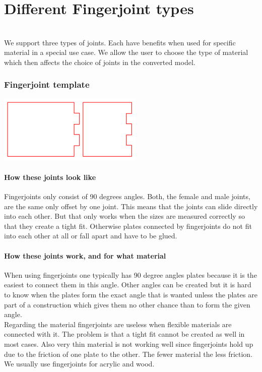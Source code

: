 \documentclass[../ClassicThesis.tex]{subfiles}
\begin{document}
\section{Different Fingerjoint types}
\\
We support three types of joints. Each have benefits when used for specific material in a special use case. We allow the user to choose the type of material which then affects the choice of joints in the converted model.
\subsubsection{Fingerjoint template}
\includegraphics[width=0.5\columnwidth]{Images/fingerjoints.png}
\paragraph{How these joints look like}
Fingerjoints only consist of 90 degrees angles. Both, the female and male joints, are the same only offset by one joint. This means that the joints can slide directly into each other. But that only works when the sizes are measured correctly so that they create a tight fit. Otherwise plates connected by fingerjoints do not fit into each other at all or fall apart and have to be glued. 
\paragraph{How these joints work, and for what material}
When using fingerjoints one typically has 90 degree angles plates because it is the easiest to connect them in this angle. Other angles can be created but it is hard to know when the plates form the exact angle that is wanted unless the plates are part of a construction which gives them no other chance than to form the given angle.\\
Regarding the material fingerjoints are useless when flexible materials are connected with it. The problem is that a tight fit cannot be created as well in most cases. Also very thin material is not working well since fingerjoints hold up due to the friction of one plate to the other. The fewer material the less friction.\\
We usually use fingerjoints for acrylic and wood.
\end{document}
